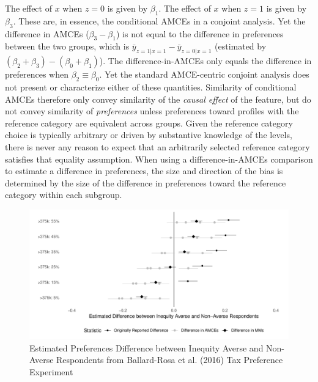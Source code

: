 \documentclass[a4paper,12pt]{article}\usepackage[]{graphicx}\usepackage[]{color}
\makeatletter
\def\maxwidth{ %
  \ifdim\Gin@nat@width>\linewidth
    \linewidth
  \else
    \Gin@nat@width
  \fi
}
\newenvironment{knitrout}{}{} %
\makeatother
\begin{document}
\noindent The effect of $x$ when $z=0$ is given by $\beta_1$. The effect of $x$ when $z=1$ is given by $\beta_3$. These are, in essence, the conditional AMCEs in a conjoint analysis. Yet the difference in AMCEs ($\beta_3 - \beta_1$) is not equal to the difference in preferences between the two groups, which is $\bar{y}_{z=1|x=1} - \bar{y}_{z=0|x=1}$ (estimated by $(\beta_2 + \beta_3) - (\beta_0 + \beta_1)$). The difference-in-AMCEs only equals the difference in preferences when $\beta_2 \equiv \beta_0$. Yet the standard AMCE-centric conjoint analysis does not present or characterize either of these quantities. Similarity of conditional AMCEs therefore only convey similarity of the \textit{causal effect} of the feature, but do not convey similarity of \textit{preferences} unless preferences toward profiles with the reference category are equivalent across groups. Given the reference category choice is typically arbitrary or driven by substantive knowledge of the levels, there is never any reason to expect that an arbitrarily selected reference category satisfies that equality assumption. When using a difference-in-AMCEs comparison to estimate a difference in preferences, the size and direction of the bias is determined by the size of the difference in preferences toward the reference category within each subgroup.

\begin{knitrout}
\color{fgcolor}\begin{figure}
\includegraphics[width=\maxwidth]{figure/bms_difference_comparison-1} \caption[Estimated Preferences Difference between Inequity Averse and Non-Averse Respondents from Ballard-Rosa et al]{Estimated Preferences Difference between Inequity Averse and Non-Averse Respondents from Ballard-Rosa et al. (2016) Tax Preference Experiment}\label{fig:bms_difference_comparison}
\end{figure}


\end{knitrout}
\end{document}
